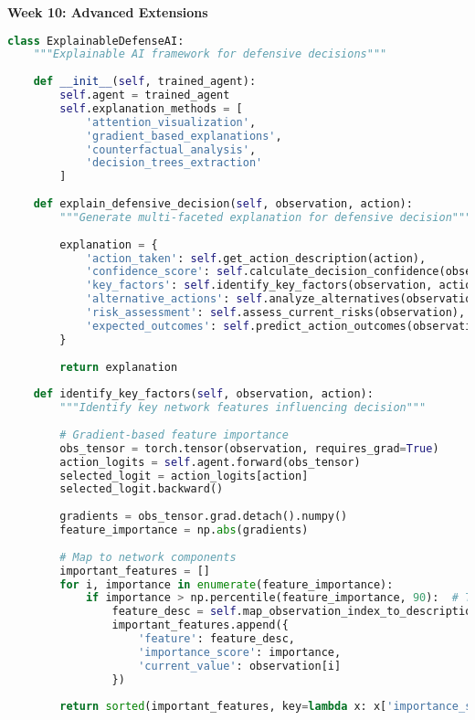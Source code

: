 \documentclass[12pt,a4paper]{article}
\begin{document}
\textbf{Week 10: Advanced Extensions}
\begin{lstlisting}[language=Python, caption=Novel Research Extensions]
class ExplainableDefenseAI:
    """Explainable AI framework for defensive decisions"""
    
    def __init__(self, trained_agent):
        self.agent = trained_agent
        self.explanation_methods = [
            'attention_visualization',
            'gradient_based_explanations', 
            'counterfactual_analysis',
            'decision_trees_extraction'
        ]
    
    def explain_defensive_decision(self, observation, action):
        """Generate multi-faceted explanation for defensive decision"""
        
        explanation = {
            'action_taken': self.get_action_description(action),
            'confidence_score': self.calculate_decision_confidence(observation, action),
            'key_factors': self.identify_key_factors(observation, action),
            'alternative_actions': self.analyze_alternatives(observation, action),
            'risk_assessment': self.assess_current_risks(observation),
            'expected_outcomes': self.predict_action_outcomes(observation, action)
        }
        
        return explanation
    
    def identify_key_factors(self, observation, action):
        """Identify key network features influencing decision"""
        
        # Gradient-based feature importance
        obs_tensor = torch.tensor(observation, requires_grad=True)
        action_logits = self.agent.forward(obs_tensor)
        selected_logit = action_logits[action]
        selected_logit.backward()
        
        gradients = obs_tensor.grad.detach().numpy()
        feature_importance = np.abs(gradients)
        
        # Map to network components
        important_features = []
        for i, importance in enumerate(feature_importance):
            if importance > np.percentile(feature_importance, 90):  # Top 10% most important
                feature_desc = self.map_observation_index_to_description(i)
                important_features.append({
                    'feature': feature_desc,
                    'importance_score': importance,
                    'current_value': observation[i]
                })
        
        return sorted(important_features, key=lambda x: x['importance_score'], reverse=True)


\end{lstlisting}
\end{document}
